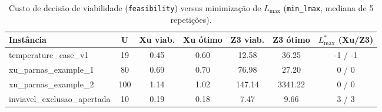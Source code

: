 \begin{table}[t]
\centering
\caption{Custo de decis\~ao de viabilidade (\texttt{feasibility}) versus minimiza\c{c}\~ao de $L_{\max}$ (\texttt{min\_lmax}, mediana de 5 repeti\c{c}\~oes).}
\label{tab:viab_vs_opt}
\scriptsize
\begin{tabular}{lcccccc}
\hline
\textbf{Inst\^ancia} & \textbf{U} & \textbf{Xu viab.} & \textbf{Xu \'otimo} & \textbf{Z3 viab.} & \textbf{Z3 \'otimo} & \textbf{$L_{\max}^*$ (Xu/Z3)} \\
\hline
temperature\_case\_v1 & 19 & 0.45 & 0.60 & 12.58 & 36.25 & -1 / -1 \\
xu\_parnas\_example\_1 & 80 & 0.69 & 0.70 & 76.98 & 27.20 & 0 / 0 \\
xu\_parnas\_example\_2 & 100 & 1.14 & 1.02 & 147.14 & 3341.22 & 0 / 0 \\
inviavel\_exclusao\_apertada & 10 & 0.19 & 0.18 & 7.47 & 9.66 & 3 / 3 \\
\hline
\end{tabular}
\end{table}
